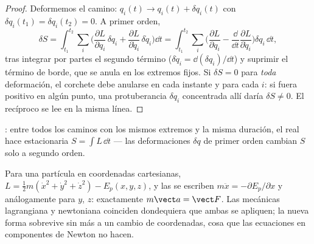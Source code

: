 \begin{proof}
Deformemos el camino: $q_i(t) \to q_i(t) + \delta q_i(t)$ con
$\delta q_i(t_1) = \delta q_i(t_2) = 0$. A primer orden,
\[
\delta S = \int_{t_1}^{t_2}\sum_i\Big(
  \frac{\partial L}{\partial q_i}\,\delta q_i
 + \frac{\partial L}{\partial\dot q_i}\,\delta\dot q_i\Big)\dd t
 = \int_{t_1}^{t_2}\sum_i\Big(
  \frac{\partial L}{\partial q_i}
 - \frac{\dd}{\dd t}\frac{\partial L}{\partial\dot q_i}\Big)\delta q_i\,\dd t ,
\]
tras integrar por partes el segundo término ($\delta\dot q_i =
\dd(\delta q_i)/\dd t$) y suprimir el término de borde, que se anula en los
extremos fijos. Si $\delta S = 0$ para \emph{toda} deformación, el corchete
debe anularse en cada instante y para cada $i$: si fuera positivo en algún
punto, una protuberancia $\delta q_i$ concentrada allí daría
$\delta S \neq 0$. El recíproco se lee en la misma línea.
\end{proof}

\begin{omfigure}

{\small {}: entre todos los caminos con los mismos
extremos y la misma duración, el real hace estacionaria $S = \int L\,\dd t$
--- las deformaciones $\delta q$ de primer orden cambian $S$ solo a segundo
orden.}
\end{omfigure}

\begin{proposition}\label{prop:b3:lagrangian-mechanics:newton}
Para una partícula en coordenadas cartesianas, $L = \tfrac12 m(\dot x^2 +
\dot y^2 + \dot z^2) - E_p(x,y,z)$, y las  se
escriben $m\ddot x = -\partial E_p/\partial x$ y análogamente para $y$, $z$:
exactamente $m\vect a = \vect F$. Las mecánicas lagrangiana y newtoniana
coinciden dondequiera que ambas se apliquen; la nueva forma sobrevive sin
más a un cambio de coordenadas, cosa que las ecuaciones en componentes de
Newton no hacen.
\end{proposition}

